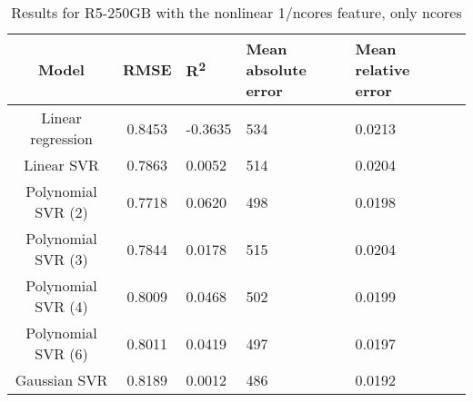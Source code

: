 \begin{table}[H]
\centering
\begin{adjustbox}{center}
\begin{tabular}{c | c M{1.2cm} M{2.5cm} M{2.5cm} M{1.8cm}}
Model & RMSE & R\textsuperscript{2} & Mean absolute error & Mean relative error \tabularnewline
\hline
Linear regression & 0.8453 & -0.3635 &    534 & 0.0213 \\
Linear SVR & 0.7863 & 0.0052 &    514 & 0.0204 \\
Polynomial SVR (2) & 0.7718 & 0.0620 &    498 & 0.0198 \\
Polynomial SVR (3) & 0.7844 & 0.0178 &    515 & 0.0204 \\
Polynomial SVR (4) & 0.8009 & 0.0468 &    502 & 0.0199 \\
Polynomial SVR (6) & 0.8011 & 0.0419 &    497 & 0.0197 \\
Gaussian SVR & 0.8189 & 0.0012 &    486 & 0.0192 \\
\end{tabular}
\end{adjustbox}
\\
\caption{Results for R5-250GB with the nonlinear 1/ncores feature, only ncores}
\label{tab:all_nonlinear_R5_250}
\end{table}
